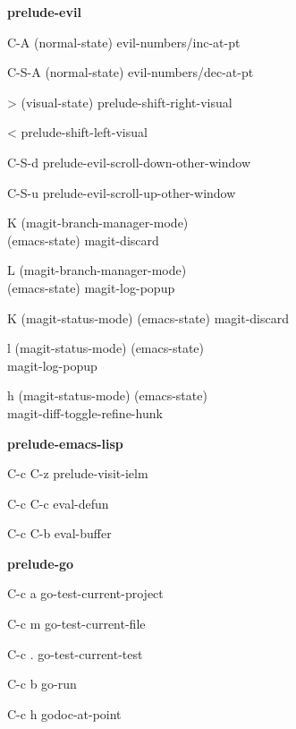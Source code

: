\documentclass[10pt]{article}
\renewcommand\subsection[1]{\smallskip\par\textbf{\color{heading}#1}}
\begin{document}
\begin{multicols}{4}
  \subsection{prelude-evil}
  \begin{keylist}
  \item[C-A] (normal-state) evil-numbers/inc-at-pt
  \item[C-S-A] (normal-state) evil-numbers/dec-at-pt
  \item[>] (visual-state) prelude-shift-right-visual
  \item[<] prelude-shift-left-visual
  \item[C-S-d] prelude-evil-scroll-down-other-window
  \item[C-S-u] prelude-evil-scroll-up-other-window
  \item[K] (magit-branch-manager-mode)\\
    (emacs-state) magit-discard
  \item[L] (magit-branch-manager-mode)\\
    (emacs-state) magit-log-popup
  \item[K] (magit-status-mode) (emacs-state) magit-discard
  \item[l] (magit-status-mode) (emacs-state)\\
    magit-log-popup
  \item[h] (magit-status-mode) (emacs-state)\\
    magit-diff-toggle-refine-hunk
  \end{keylist}

  \subsection{prelude-emacs-lisp}
  \begin{keylist}
  \item[C-c C-z] prelude-visit-ielm
  \item[C-c C-c] eval-defun
  \item[C-c C-b] eval-buffer
  \end{keylist}

  \subsection{prelude-go}
  \begin{keylist}
  \item[C-c a] go-test-current-project
  \item[C-c m] go-test-current-file
  \item[C-c .] go-test-current-test
  \item[C-c b] go-run
  \item[C-c h] godoc-at-point
  \end{keylist}


\end{multicols}
\end{document}

